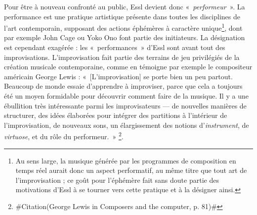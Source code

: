 \documentclass[a4paper,12pt]{article}
\newcommand{\guill}[1]{«~#1~»}
\newcommand{\zitat}[2]{\#Citation(#2)\#}
\begin{document}
Pour être à nouveau confronté au public, Essl devient donc \guill{\emph{performeur}}. La performance est une pratique artistique présente dans toutes les disciplines de l'art contemporain, supposant des actions éphémères à caractère unique\footnote{Au sens large, la musique générée par les programmes de composition en temps réel aurait donc un aspect performatif, au même titre que tout art de l'improvisation ; ce goût pour l'éphémère fait sans doute partie des motivations d'Essl à se tourner vers cette pratique et à la désigner ainsi.}, dont par exemple John Cage ou Yoko Ono font partie des initiateurs. La désignation est cependant exagérée : les \guill{performances} d'Essl sont avant tout des improvisations. L'improvisation fait partie des terrains de jeu privilégiés de la création musicale contemporaine, comme en témoigne par exemple le compositeur américain George Lewis : \guill{[L'improvisation] se porte bien un peu partout. Beaucoup de monde essaie d'apprendre à improviser, parce que cela a toujours été un moyen formidable pour découvrir comment faire de la musique. Il y a une ébullition très intéressante parmi les improvisateurs --- de nouvelles manières de structurer, des idées élaborées pour intégrer des partitions à l'intérieur de l'improvisation, de nouveaux sons, un élargissement des notions d'\emph{instrument}, de \emph{virtuose}, et du rôle du performeur.}
\footnote{\zitat{I think it [improvisation] is a healthy situation overall. Many people are trying to learn to improvise, because it has traditionally been a wonderful way to learn about the possibilities of making music. There is a lot of interesting activity among improvisers --- new methods of structuring, advanced ideas of how to integrate scores with improvisation, interesting new souunds, extended notions of what an \emph{instrument} is, what a \emph{virtuoso} is, what a performer's role is.}
{George Lewis in Composers and the computer, p. 81}}.
\end{document}
